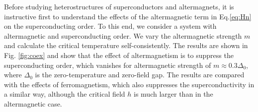 \documentclass[aps,twocolumn,amsmath,amssymb,preprintnumbers,floatfix,prl,superscriptaddress,longbibliography]{revtex4-2}%
\newcommand{\eq}{Eq.}%
\begin{document}
Before studying heterostructures of superconductors and altermagnets, it is instructive first to understand the effects of the altermagnetic term in \eq \eqref{eq:Hn} on the superconducting order.
To this end, we consider a system with altermagnetic and superconducting order. We vary the altermagnetic strength $m$ and calculate the critical temperature self-consistently. The results are shown in Fig. \ref{fig:coex} and show that the effect of altermagnetism is to suppress the superconducting order, which vanishes for altermagnetic strength of $m \approx 0.3 \Delta_0$, where $\Delta_0$ is the zero-temperature and zero-field gap. The results are compared with the effects of ferromagnetism, which also suppresses the superconductivity in a similar way, although the critical field $h$ is much larger than in the altermagnetic case.
\end{document}
